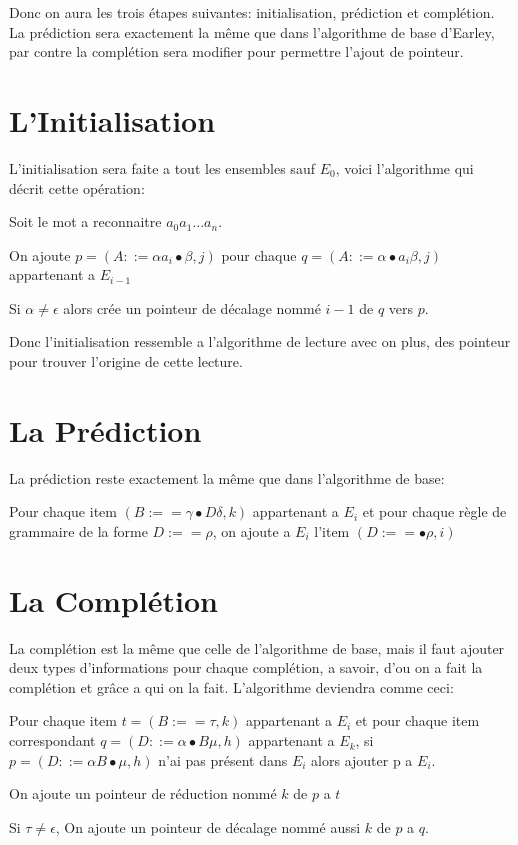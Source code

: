 \documentclass[10pt]{report}
\begin{document}
Donc on aura les trois étapes suivantes: initialisation, prédiction et complétion. La prédiction sera exactement la même que dans l'algorithme de base d'Earley, par contre la complétion sera modifier pour permettre l'ajout de pointeur.

\section{L'Initialisation}
L'initialisation sera faite a tout les ensembles sauf $E_0$, voici l'algorithme qui décrit cette opération:

Soit le mot a reconnaitre $a_0 a_1 ... a_n$. 

On ajoute $p = (A ::= \alpha a_i • \beta, j)$ pour chaque $q = (A ::= \alpha • a_i \beta, j)$ appartenant a $E_{i-1}$

Si $\alpha \neq \epsilon$ alors crée un pointeur de décalage nommé $i-1$ de $q$ vers $p$.

Donc l'initialisation ressemble a l'algorithme de lecture avec on plus, des pointeur pour trouver l'origine de cette lecture.

\section{La Prédiction}
La prédiction reste exactement la même que dans l'algorithme de base:

Pour chaque item $(B :== \gamma • D \delta, k)$ appartenant a $E_i$ et pour chaque règle de grammaire de la forme $D :== \rho$, on ajoute a $E_i$ l'item $(D :== • \rho, i)$

\section{La Complétion}
La complétion est la même que celle de l'algorithme de base, mais il faut ajouter deux types d'informations pour chaque complétion, a savoir, d'ou on a fait la complétion et grâce a qui on la fait. L'algorithme deviendra comme ceci:

Pour chaque item $t = (B :== \tau, k)$ appartenant a $E_i$ et pour chaque item correspondant $q = (D ::= \alpha • B \mu, h)$ appartenant a $E_k$, si $p = (D ::= \alpha B • \mu, h)$ n'ai pas présent dans $E_i$ alors ajouter p a $E_i$.

On ajoute un pointeur de réduction nommé $k$ de $p$ a $t$

Si $\tau \neq \epsilon$, On ajoute un pointeur de décalage nommé aussi $k$ de $p$ a $q$.
\end{document}
